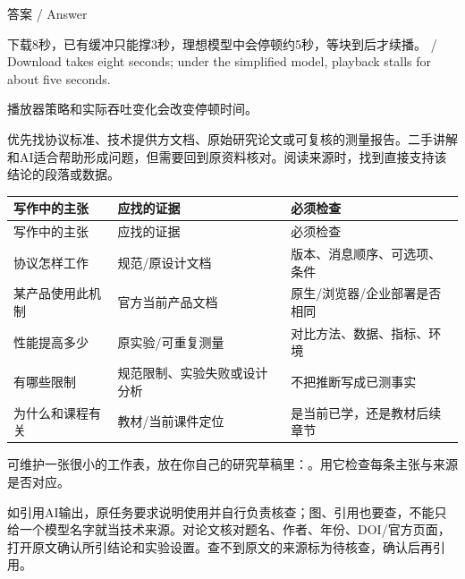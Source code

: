\begin{StudySolution}{答案 / Answer}


下载8秒，已有缓冲只能撑3秒，理想模型中会停顿约5秒，等块到后才续播。 / Download takes eight seconds; under the simplified model, playback stalls for about five seconds.


\end{StudySolution}


播放器策略和实际吞吐变化会改变停顿时间。





优先找协议标准、技术提供方文档、原始研究论文或可复核的测量报告。二手讲解和AI适合帮助形成问题，但需要回到原资料核对。阅读来源时，找到直接支持该结论的段落或数据。


\begingroup
\small\setlength{\tabcolsep}{3pt}
\renewcommand{\arraystretch}{1.22}
\begin{longtable}{@{}>{\raggedright\arraybackslash}p{}>{\raggedright\arraybackslash}p{}>{\raggedright\arraybackslash}p{}@{}}
\toprule
写作中的主张 & 应找的证据 & 必须检查 \\
\midrule\endfirsthead
写作中的主张 & 应找的证据 & 必须检查 \\
\midrule\endhead
\bottomrule\endfoot
协议怎样工作 & 规范/原设计文档 & 版本、消息顺序、可选项、条件 \\
某产品使用此机制 & 官方当前产品文档 & 原生/浏览器/企业部署是否相同 \\
性能提高多少 & 原实验/可重复测量 & 对比方法、数据、指标、环境 \\
有哪些限制 & 规范限制、实验失败或设计分析 & 不把推断写成已测事实 \\
为什么和课程有关 & 教材/当前课件定位 & 是当前已学，还是教材后续章节 \\
\end{longtable}
\endgroup


可维护一张很小的工作表，放在你自己的研究草稿里：。用它检查每条主张与来源是否对应。


如引用AI输出，原任务要求说明使用并自行负责核查；图、引用也要查，不能只给一个模型名字就当技术来源。对论文核对题名、作者、年份、DOI/官方页面，打开原文确认所引结论和实验设置。查不到原文的来源标为待核查，确认后再引用。



